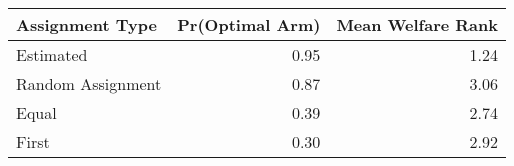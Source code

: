 
\begin{table}
\centering
\begin{tabular}{lrr}
\toprule
Assignment Type & Pr(Optimal Arm) & Mean Welfare Rank\\
\midrule
Estimated & 0.95 & 1.24\\
Random Assignment & 0.87 & 3.06\\
Equal & 0.39 & 2.74\\
First & 0.30 & 2.92\\
\bottomrule
\end{tabular}
\end{table}